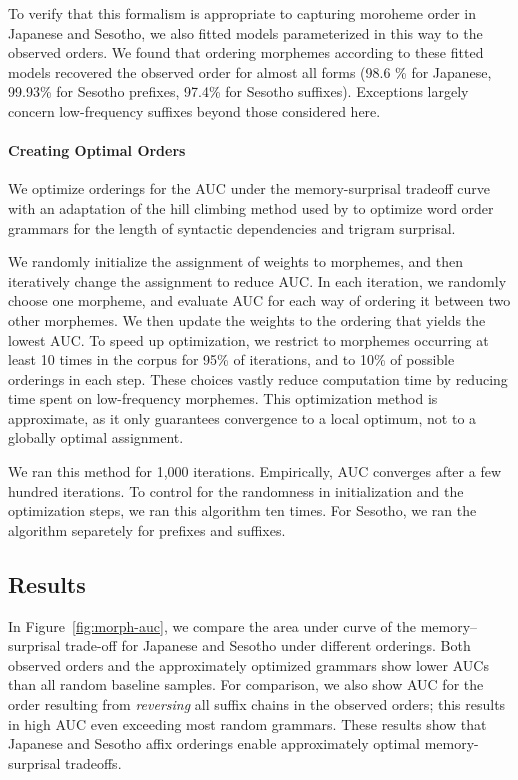 To verify that this formalism is appropriate to capturing moroheme order in Japanese and Sesotho, we also fitted models parameterized in this way to the observed orders.
We found that ordering morphemes according to these fitted models recovered the observed order for almost all forms (98.6 \% for Japanese, 99.93\% for Sesotho prefixes, 97.4\% for Sesotho suffixes).
Exceptions largely concern low-frequency suffixes beyond those considered here.


\paragraph{Creating Optimal Orders}

We optimize orderings for the AUC under the memory-surprisal tradeoff curve with an adaptation of the hill climbing method used by \citet{gildea-human-2015} to optimize word order grammars for the length of syntactic dependencies and trigram surprisal.

We randomly initialize the assignment of weights to morphemes, and then iteratively change the assignment to reduce AUC.
In each iteration, we randomly choose one morpheme, and evaluate AUC for each way of ordering it between two other morphemes.
We then update the weights to the ordering that yields the lowest AUC.
To speed up optimization, we restrict to morphemes occurring at least 10 times in the corpus for 95\% of iterations, and to 10\% of possible orderings in each step.
These choices vastly reduce computation time by reducing time spent on low-frequency morphemes.
This optimization method is approximate, as it only guarantees convergence to a local optimum, not to a globally optimal assignment.

We ran this method for 1,000 iterations. Empirically, AUC converges after a few hundred iterations.
To control for the randomness in initialization and the optimization steps, we ran this algorithm ten times.
For Sesotho, we ran the algorithm separetely for prefixes and suffixes.

\subsection{Results}
In Figure~\ref{fig:morph-auc}, we compare the area under curve of the memory--surprisal trade-off for Japanese and Sesotho under different orderings.
Both observed orders and the approximately optimized grammars show lower AUCs than all random baseline samples.
For comparison, we also show AUC for the order resulting from \emph{reversing} all suffix chains in the observed orders; this results in high AUC even exceeding most random grammars.
These results show that Japanese and Sesotho affix orderings enable approximately optimal memory-surprisal tradeoffs.



